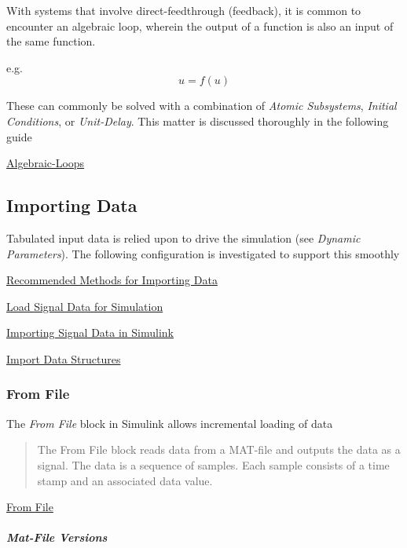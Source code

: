 \documentclass[]{article}
\let\oldsubparagraph\subparagraph
\renewcommand{\subparagraph}[1]{\oldsubparagraph{#1}\mbox{}}
\begin{document}
With systems that involve direct-feedthrough (feedback), it is common to
encounter an algebraic loop, wherein the output of a function is also an
input of the same function.

e.g. \[ u = f(u) \]

These can commonly be solved with a combination of \emph{Atomic
Subsystems}, \emph{Initial Conditions}, or \emph{Unit-Delay}. This
matter is discussed thoroughly in the following guide

\href{http://www.mathworks.com/help/simulink/ug/algebraic-loops.html}{Algebraic-Loops}

\subsection{Importing Data}\label{importing-data}

Tabulated input data is relied upon to drive the simulation (see
\emph{Dynamic Parameters}). The following configuration is investigated
to support this smoothly

\href{http://www.mathworks.com/help/matlab/import_export/recommended-methods-for-importing-data.html}{Recommended
Methods for Importing Data}

\href{http://www.mathworks.com/help/simulink/import-data.html}{Load
Signal Data for Simulation}

\href{http://www.mathworks.com/help/simulink/ug/importing-signal-data-in-simulink.html}{Importing
Signal Data in Simulink}

\href{http://www.mathworks.com/help/simulink/ug/importing-data-structures-to-a-root-level-input-port.html}{Import
Data Structures}

\subsubsection{From File}\label{from-file}

The \emph{From File} block in Simulink allows incremental loading of
data

\begin{quote}
The From File block reads data from a MAT-file and outputs the data as a
signal. The data is a sequence of samples. Each sample consists of a
time stamp and an associated data value.
\end{quote}

\href{http://www.mathworks.com/help/simulink/slref/fromfile.html}{From
File}

\subparagraph{Mat-File Versions}\label{mat-file-versions}
\end{document}
